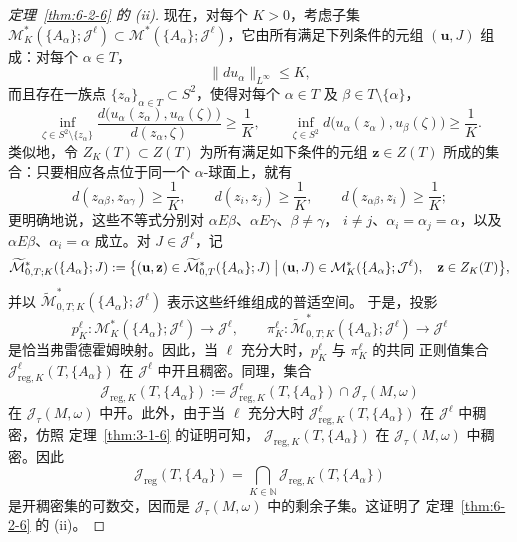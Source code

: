 \begin{proof}[定理~\ref{thm:6-2-6} 的 (ii)]
现在，对每个 $K>0$，考虑子集
$\mathcal M^*_K(\{A_\alpha\};\mathcal J^\ell)
\subset\mathcal M^*(\{A_\alpha\};\mathcal J^\ell)$，它由所有满足下列条件的元组
$(\mathbf u,J)$ 组成：对每个 $\alpha\in T$，
\begin{equation}\label{eq:6-2-5}
  \lVert du_\alpha\rVert_{L^\infty}\le K,
\end{equation}
而且存在一族点 $\{z_\alpha\}_{\alpha\in T}\subset S^2$，使得对每个
$\alpha\in T$ 及 $\beta\in T\setminus\{\alpha\}$，
\begin{equation}\label{eq:6-2-6}
  \inf_{\zeta\in S^2\setminus\{z_\alpha\}}
  \frac{d\bigl(u_\alpha(z_\alpha),u_\alpha(\zeta)\bigr)}
       {d(z_\alpha,\zeta)}
  \ge\frac1K,
  \qquad
  \inf_{\zeta\in S^2}
  d\bigl(u_\alpha(z_\alpha),u_\beta(\zeta)\bigr)
  \ge\frac1K.
\end{equation}
类似地，令 $Z_K(T)\subset Z(T)$ 为所有满足如下条件的元组
$\mathbf z\in Z(T)$ 所成的集合：只要相应各点位于同一个 $\alpha$-球面上，就有
\[
  d(z_{\alpha\beta},z_{\alpha\gamma})\ge\frac1K,
  \qquad
  d(z_i,z_j)\ge\frac1K,
  \qquad
  d(z_{\alpha\beta},z_i)\ge\frac1K;
\]
更明确地说，这些不等式分别对
$\alpha E\beta$、$\alpha E\gamma$、$\beta\ne\gamma$，
$i\ne j$、$\alpha_i=\alpha_j=\alpha$，以及
$\alpha E\beta$、$\alpha_i=\alpha$ 成立。对 $J\in\mathcal J^\ell$，记
\[
  \widetilde{\mathcal M}^*_{0,T;K}(\{A_\alpha\};J)
  :=\bigl\{(\mathbf u,\mathbf z)\in
    \widetilde{\mathcal M}^*_{0,T}(\{A_\alpha\};J)
    \bigm|(\mathbf u,J)\in
    \mathcal M^*_K(\{A_\alpha\};\mathcal J^\ell),\quad
    \mathbf z\in Z_K(T)\bigr\},
\]
并以
$\widetilde{\mathcal M}^*_{0,T;K}
(\{A_\alpha\};\mathcal J^\ell)$
表示这些纤维组成的普适空间。
于是，投影
\[
  p_K^\ell:\mathcal M^*_K(\{A_\alpha\};\mathcal J^\ell)
  \longrightarrow\mathcal J^\ell,
  \qquad
  \pi_K^\ell:\widetilde{\mathcal M}^*_{0,T;K}
  (\{A_\alpha\};\mathcal J^\ell)\longrightarrow\mathcal J^\ell
\]
是恰当弗雷德霍姆映射。因此，当 $\ell$ 充分大时，$p_K^\ell$ 与 $\pi_K^\ell$ 的共同
正则值集合 $\mathcal J^\ell_{\mathrm{reg},K}(T,\{A_\alpha\})$ 在
$\mathcal J^\ell$ 中开且稠密。同理，集合
\[
  \mathcal J_{\mathrm{reg},K}(T,\{A_\alpha\})
  :=\mathcal J^\ell_{\mathrm{reg},K}(T,\{A_\alpha\})
  \cap\mathcal J_\tau(M,\omega)
\]
在 $\mathcal J_\tau(M,\omega)$ 中开。此外，由于当 $\ell$ 充分大时
$\mathcal J^\ell_{\mathrm{reg},K}(T,\{A_\alpha\})$ 在 $\mathcal J^\ell$ 中稠密，仿照
定理~\ref{thm:3-1-6} 的证明可知，
$\mathcal J_{\mathrm{reg},K}(T,\{A_\alpha\})$ 在
$\mathcal J_\tau(M,\omega)$ 中稠密。因此
\[
  \mathcal J_{\mathrm{reg}}(T,\{A_\alpha\})
  =\bigcap_{K\in\mathbb N}
  \mathcal J_{\mathrm{reg},K}(T,\{A_\alpha\})
\]
是开稠密集的可数交，因而是 $\mathcal J_\tau(M,\omega)$ 中的剩余子集。这证明了
定理~\ref{thm:6-2-6} 的 (ii)。
\end{proof}

